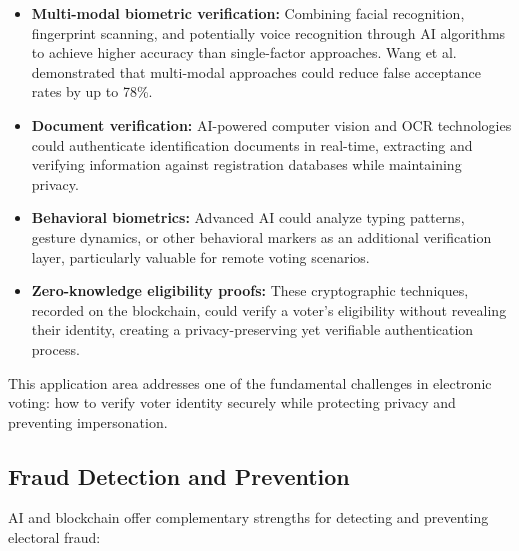 \documentclass[conference]{IEEEtran}
\begin{document}
\begin{itemize}
    \item \textbf{Multi-modal biometric verification:} Combining facial recognition, fingerprint scanning, and potentially voice recognition through AI algorithms to achieve higher accuracy than single-factor approaches. Wang et al. \cite{b11} demonstrated that multi-modal approaches could reduce false acceptance rates by up to 78\%.
    
    \item \textbf{Document verification:} AI-powered computer vision and OCR technologies could authenticate identification documents in real-time, extracting and verifying information against registration databases while maintaining privacy.
    
    \item \textbf{Behavioral biometrics:} Advanced AI could analyze typing patterns, gesture dynamics, or other behavioral markers as an additional verification layer, particularly valuable for remote voting scenarios.
    
    \item \textbf{Zero-knowledge eligibility proofs:} These cryptographic techniques, recorded on the blockchain, could verify a voter's eligibility without revealing their identity, creating a privacy-preserving yet verifiable authentication process.
\end{itemize}

This application area addresses one of the fundamental challenges in electronic voting: how to verify voter identity securely while protecting privacy and preventing impersonation.

\subsection{Fraud Detection and Prevention}
AI and blockchain offer complementary strengths for detecting and preventing electoral fraud:
\end{document}
